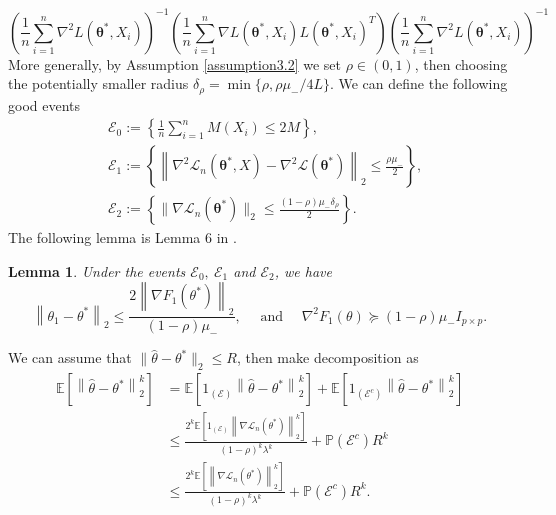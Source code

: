 \documentclass[12pt]{article}
\numberwithin{equation}{section}
\newtheorem{lemma}[theorem]{Lemma}
\begin{document}
\begin{equation}
\left(\frac{1}{n}\sum_{i=1}^n\nabla^2 L(\boldsymbol{\theta}^{*},X_i)\right)^{-1}\left(\frac{1}{n}\sum_{i=1}^n\nabla L(\boldsymbol{\theta}^{*},X_i)L(\boldsymbol{\theta}^{*},X_i)^T\right)\left(\frac{1}{n}\sum_{i=1}^n\nabla^2 L(\boldsymbol{\theta}^{*},X_i)\right)^{-1}
\end{equation}
More generally, by Assumption \ref{assumption3.2} we set $\rho \in (0,1)$, then choosing the potentially smaller radius $\delta_{\rho}=\min \{\rho, \rho \mu_{-} / 4 L\}$. We can define the following good events
\begin{align*}
&\mathcal{E}_{0}:=\left\{\frac{1}{n} \sum_{i=1}^{n} M\left(X_{i}\right) \leq 2 M\right\},\\
&\mathcal{E}_{1}:=\left\{\left\|\nabla^{2} \mathcal{L}_n\left(\boldsymbol{\theta}^{*},X\right)-\nabla^{2} \mathcal{L}\left(\boldsymbol{\theta}^{*}\right)\right\|_{2} \leq \frac{\rho\mu_{-}}{2}\right\},\\
&\mathcal{E}_2:=\left\{\|\nabla\mathcal{L}_n\left(\boldsymbol{\theta}^{*}\right)\|_2\leq \frac{(1-\rho) \mu_{-} \delta_{\rho}}{2}\right\}.
\end{align*}
The following lemma is Lemma 6 in \citet{zhang2013communication}.
\begin{lemma}\label{lemma3.7}
	Under the events $\mathcal{E}_0,\ \mathcal{E}_1$ and $\mathcal{E}_2$, we have
	\begin{equation}
	\left\|\theta_{1}-\theta^{*}\right\|_{2} \leq \frac{2\left\|\nabla F_{1}\left(\theta^{*}\right)\right\|_{2}}{(1-\rho) \mu_{-}}, \quad \text { and } \quad \nabla^{2} F_{1}(\theta) \succeq(1-\rho) \mu_{-} I_{p \times p}.
	\end{equation}
\end{lemma}
We can assume that $\|\hat \theta-\theta^{*}\|_2\leq R$, then make decomposition as
\begin{align*}
\mathbb{E}\left[\left\|\hat\theta-\theta^{*}\right\|_{2}^{k}\right] &=\mathbb{E}\left[1_{(\mathcal{E})}\left\|\hat\theta-\theta^{*}\right\|_{2}^{k}\right]+\mathbb{E}\left[1_{\left(\mathcal{E}^{c}\right)}\left\|\hat\theta-\theta^{*}\right\|_{2}^{k}\right] \\
& \leq \frac{2^{k} \mathbb{E}\left[1_{(\mathcal{E})}\left\|\nabla \mathcal{L}_n\left(\theta^{*}\right)\right\|_{2}^{k}\right]}{(1-\rho)^{k} \lambda^{k}}+\mathbb{P}\left(\mathcal{E}^{c}\right) R^{k} \\
& \leq \frac{2^{k} \mathbb{E}\left[\left\|\nabla \mathcal{L}_n\left(\theta^{*}\right)\right\|_{2}^{k}\right]}{(1-\rho)^{k} \lambda^{k}}+\mathbb{P}\left(\mathcal{E}^{c}\right) R^{k}.
\end{align*}
\end{document}
